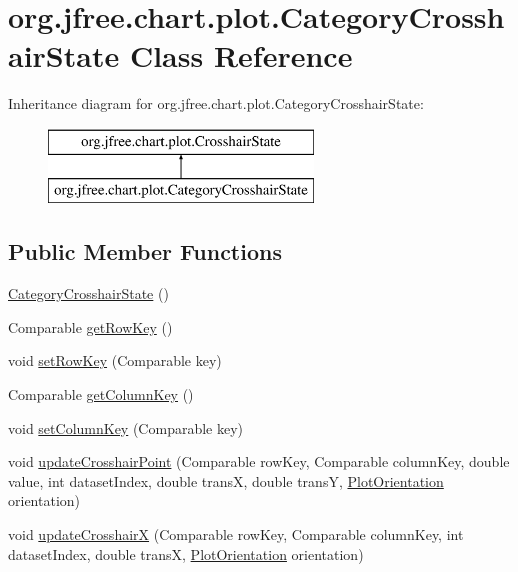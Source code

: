 \hypertarget{classorg_1_1jfree_1_1chart_1_1plot_1_1_category_crosshair_state}{}\section{org.\+jfree.\+chart.\+plot.\+Category\+Crosshair\+State Class Reference}
\label{classorg_1_1jfree_1_1chart_1_1plot_1_1_category_crosshair_state}
Inheritance diagram for org.\+jfree.\+chart.\+plot.\+Category\+Crosshair\+State\+:\begin{figure}[H]
\begin{center}
\leavevmode
\includegraphics[height=2.000000cm]{classorg_1_1jfree_1_1chart_1_1plot_1_1_category_crosshair_state}
\end{center}
\end{figure}
\subsection*{Public Member Functions}
\begin{DoxyCompactItemize}
\item 
\mbox{\hyperlink{classorg_1_1jfree_1_1chart_1_1plot_1_1_category_crosshair_state_a0452545ee51022ebc29c91d719c88020}{Category\+Crosshair\+State}} ()
\item 
Comparable \mbox{\hyperlink{classorg_1_1jfree_1_1chart_1_1plot_1_1_category_crosshair_state_a5b9546b0550ca8ad4d9e46c1841483ad}{get\+Row\+Key}} ()
\item 
void \mbox{\hyperlink{classorg_1_1jfree_1_1chart_1_1plot_1_1_category_crosshair_state_a390eeddcfad8a2fe5c7501a97810637a}{set\+Row\+Key}} (Comparable key)
\item 
Comparable \mbox{\hyperlink{classorg_1_1jfree_1_1chart_1_1plot_1_1_category_crosshair_state_ab7c311c195aa9cd49609a59c8fc69f7c}{get\+Column\+Key}} ()
\item 
void \mbox{\hyperlink{classorg_1_1jfree_1_1chart_1_1plot_1_1_category_crosshair_state_a3dbb1cfc95fc814b4a5388f7ff8baa31}{set\+Column\+Key}} (Comparable key)
\item 
void \mbox{\hyperlink{classorg_1_1jfree_1_1chart_1_1plot_1_1_category_crosshair_state_add35c7dfaa902b05d10556c3b2c16e90}{update\+Crosshair\+Point}} (Comparable row\+Key, Comparable column\+Key, double value, int dataset\+Index, double transX, double transY, \mbox{\hyperlink{classorg_1_1jfree_1_1chart_1_1plot_1_1_plot_orientation}{Plot\+Orientation}} orientation)
\item 
void \mbox{\hyperlink{classorg_1_1jfree_1_1chart_1_1plot_1_1_category_crosshair_state_a333fd2bd776cdfe1df3434524fb4aefa}{update\+CrosshairX}} (Comparable row\+Key, Comparable column\+Key, int dataset\+Index, double transX, \mbox{\hyperlink{classorg_1_1jfree_1_1chart_1_1plot_1_1_plot_orientation}{Plot\+Orientation}} orientation)
\end{DoxyCompactItemize}


